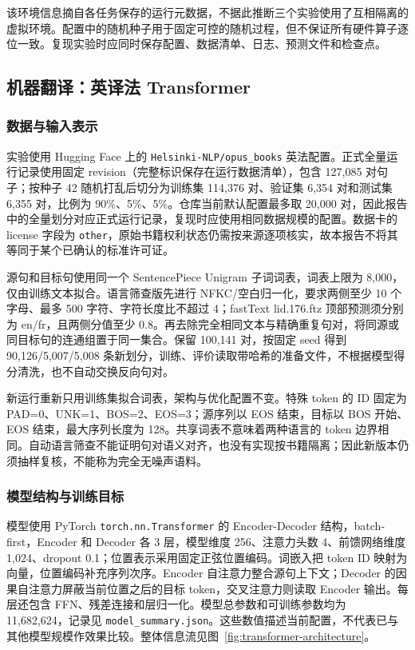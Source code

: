 \documentclass[UTF8,a4paper,12pt,fontset=none]{ctexart}
\begin{document}
该环境信息摘自各任务保存的运行元数据，不据此推断三个实验使用了互相隔离的虚拟环境。配置中的随机种子用于固定可控的随机过程，但不保证所有硬件算子逐位一致。复现实验时应同时保存配置、数据清单、日志、预测文件和检查点。

\subsection{机器翻译：英译法 Transformer}

\subsubsection{数据与输入表示}
实验使用 Hugging Face 上的 \texttt{Helsinki-NLP/opus\_books} 英法配置。正式全量运行记录使用固定 revision（完整标识保存在运行数据清单），包含 127,085 对句子；按种子 42 随机打乱后切分为训练集 114,376 对、验证集 6,354 对和测试集 6,355 对，比例为 90\%、5\%、5\%。仓库当前默认配置最多取 20,000 对，因此报告中的全量划分对应正式运行记录，复现时应使用相同数据规模的配置。数据卡的 license 字段为 \texttt{other}，原始书籍权利状态仍需按来源逐项核实，故本报告不将其等同于某个已确认的标准许可证\cite{opus,opusbooks}。

源句和目标句使用同一个 SentencePiece Unigram 子词词表，词表上限为 8,000，仅由训练文本拟合。语言筛查版先进行 NFKC/空白归一化，要求两侧至少 10 个字母、最多 500 字符、字符长度比不超过 4；fastText lid.176.ftz 顶部预测须分别为 en/fr，且两侧分值至少 0.8\cite{fasttext_lid}。再去除完全相同文本与精确重复句对，将同源或同目标句的连通组置于同一集合。保留 100,141 对，按固定 seed 得到 90,126/5,007/5,008 条新划分，训练、评价读取带哈希的准备文件，不根据模型得分清洗，也不自动交换反向句对。

新运行重新只用训练集拟合词表，架构与优化配置不变。特殊 token 的 ID 固定为 PAD=0、UNK=1、BOS=2、EOS=3；源序列以 EOS 结束，目标以 BOS 开始、EOS 结束，最大序列长度为 128。共享词表不意味着两种语言的 token 边界相同\cite{sentencepiece}。自动语言筛查不能证明句对语义对齐，也没有实现按书籍隔离；因此新版本仍须抽样复核，不能称为完全无噪声语料。

\subsubsection{模型结构与训练目标}
模型使用 PyTorch \texttt{torch.nn.Transformer} 的 Encoder-Decoder 结构，batch-first，Encoder 和 Decoder 各 3 层，模型维度 256、注意力头数 4、前馈网络维度 1,024、dropout 0.1；位置表示采用固定正弦位置编码。词嵌入把 token ID 映射为向量，位置编码补充序列次序。Encoder 自注意力整合源句上下文；Decoder 的因果自注意力屏蔽当前位置之后的目标 token，交叉注意力则读取 Encoder 输出。每层还包含 FFN、残差连接和层归一化。模型总参数和可训练参数均为 11,682,624，记录见 \texttt{model\_summary.json}。这些数值描述当前配置，不代表已与其他模型规模作效果比较\cite{transformer}。整体信息流见图~\ref{fig:transformer-architecture}。
\end{document}
